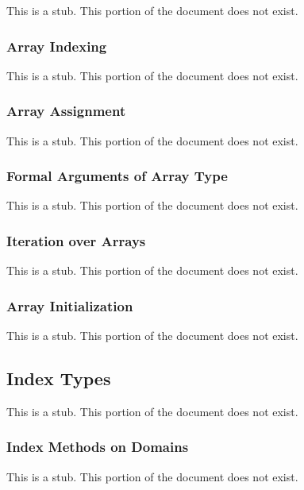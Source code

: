 This is a stub.  This portion of the document does not exist.

\subsubsection{Array Indexing}
\label{Array_Indexing}

This is a stub.  This portion of the document does not exist.

\subsubsection{Array Assignment}
\label{Array_Assignment}

This is a stub.  This portion of the document does not exist.

\subsubsection{Formal Arguments of Array Type}
\label{Formal_Arguments_of_Array_Type}

This is a stub.  This portion of the document does not exist.

\subsubsection{Iteration over Arrays}
\label{Iteration_over_Arrays}

This is a stub.  This portion of the document does not exist.

\subsubsection{Array Initialization}
\label{Array_Initialization}

This is a stub.  This portion of the document does not exist.

\subsection{Index Types}
\label{Index_Types}

This is a stub.  This portion of the document does not exist.

\subsubsection{Index Methods on Domains}
\label{Index_Methods_on_Domains}

This is a stub.  This portion of the document does not exist.

